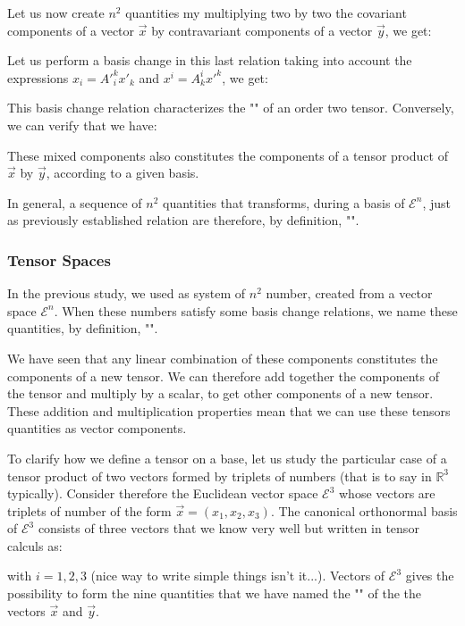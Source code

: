 	Let us now create $n^2$ quantities my multiplying two by two the covariant components of a vector $\vec{x}$ by contravariant components of a vector $\vec{y}$, we get:
	
	Let us perform a basis change in this last relation taking into account the expressions $x_i={A'}_i^k{x'}_k$ and $x^i={A}_k^i {x'}^k$, we get:
	
	This basis change relation characterizes the "" of an order two tensor. Conversely, we can verify that we have:
	
	These mixed components also constitutes the components of a tensor product of $\vec{x}$ by $\vec{y}$, according to a given basis.
	
	In general, a sequence of  $n^2$ quantities that transforms, during a basis of $\mathcal{E}^n$, just as previously established relation are therefore, by definition, "".
	
	\pagebreak
	\subsubsection{Tensor Spaces}
	In the previous study, we used as system of $n^2$ number, created from a vector space $\mathcal{E}^n$. When these numbers satisfy some basis change relations, we name these quantities, by definition, "".

	We have seen that any linear combination of these components constitutes the components of a new tensor. We can therefore add together the components of the tensor and multiply by a scalar, to get other components of a new tensor. These addition and multiplication properties mean that we can use these tensors quantities as vector components.
	
	To clarify how we define a tensor on a base, let us study the particular case of a tensor product of two vectors formed by triplets of numbers (that is to say in $\mathbb{R}^3$ typically). Consider therefore the Euclidean vector space $\mathcal{E}^3$ whose vectors are triplets of number of the form $\vec{x}=(x_1,x_2,x_3)$. The canonical orthonormal basis of $\mathcal{E}^3$ consists of three vectors that we know very well but written in tensor calculs as:
	
	with $i=1,2,3$ (nice way to write simple things isn't it...).
	Vectors of $\mathcal{E}^3$ gives the possibility to form the nine quantities that we have named the "" of the the vectors $\vec{x}$ and $\vec{y}$.
	
